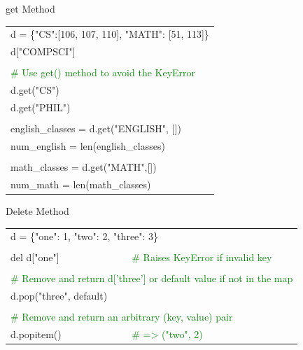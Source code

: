 \documentclass[serif, aspectratio=169]{beamer}
\newcommand{\tgreen}[1]{\textcolor{green}{#1}}
\newenvironment{CLI} %
    {
    \noindent
    \ttfamily 
    \footnotesize
    \begin{tcolorbox}[colback=gray!150,colframe=black]
    \color{white}
    \begin{tabular}{p{4.5cm}p{7.5cm}}
    }
    { 
    \end{tabular}
    \end{tcolorbox}
    }
\begin{document}
\begin{frame}{get Method}
    \begin{CLI}
        \multicolumn{2}{l}{d = \{"CS":[106, 107, 110], "MATH": [51, 113]\}} \\
        d["COMPSCI"] & \\%
        & \\
        \multicolumn{2}{l}{\tgreen{\# Use get() method to avoid the KeyError}} \\
        d.get("CS") & \\%
        d.get("PHIL") & \\%
        & \\
        \multicolumn{2}{l}{english\_classes = d.get("ENGLISH", [])} \\
        \multicolumn{2}{l}{num\_english = len(english\_classes)} \\
        & \\
        \multicolumn{2}{l}{math\_classes = d.get("MATH",[])} \\
        \multicolumn{2}{l}{num\_math = len(math\_classes)} \\
    \end{CLI}
\end{frame}

\begin{frame}{Delete Method}
    \begin{CLI}
        \multicolumn{2}{l}{d = \{"one": 1, "two": 2, "three": 3\}} \\
        & \\
        del d["one"] & \tgreen{\# Raises KeyError if invalid key} \\
        & \\
        \multicolumn{2}{l}{\tgreen{\# Remove and return d['three'] or default value if not in the map}} \\
        d.pop("three", default) & \\
        & \\
        \multicolumn{2}{l}{\tgreen{\# Remove and return an arbitrary (key, value) pair}} \\
        d.popitem() & \tgreen{\# => ("two", 2)} \\
    \end{CLI}
\end{frame}
\end{document}
